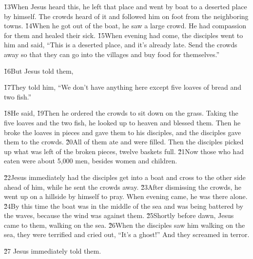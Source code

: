 \v{13}When Jesus heard this, he left that place and went by boat to a deserted place by himself. The crowds heard of it and followed him on foot from the neighboring towns. \v{14}When he got out of the boat, he saw a large crowd. He had compassion for them and healed their sick. \v{15}When evening had come, the disciples went to him and said, ``This is a deserted place, and it's already late. Send the crowds away so that they can go into the villages and buy food for themselves.''

\v{16}But Jesus told them, 

\v{17}They told him, ``We don't have anything here except five loaves of bread and two fish.''

\v{18}He said,  \v{19}Then he ordered the crowds to sit down on the grass. Taking the five loaves and the two fish, he looked up to heaven and blessed them. Then he broke the loaves in pieces and gave them to his disciples, and the disciples gave them to the crowds. \v{20}All of them ate and were filled. Then the disciples picked up what was left of the broken pieces, twelve baskets full. \v{21}Now those who had eaten were about 5,000 men, besides women and children.

\v{22}Jesus immediately had the disciples get into a boat and cross to the other side ahead of him, while he sent the crowds away. \v{23}After dismissing the crowds, he went up on a hillside by himself to pray. When evening came, he was there alone. \v{24}By this time the boat was in the middle of the sea and was being battered by the waves, because the wind was against them. \v{25}Shortly before dawn, Jesus came to them, walking on the sea. \v{26}When the disciples saw him walking on the sea, they were terrified and cried out, ``It's a ghost!'' And they screamed in terror.

\v{27} Jesus immediately told them. 

